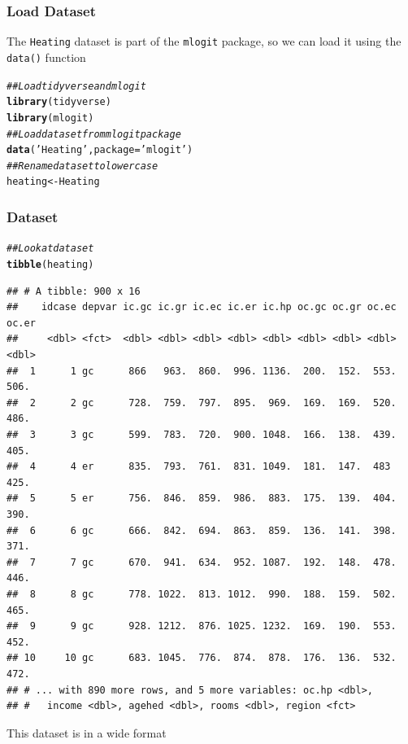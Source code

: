 \documentclass{beamer}\usepackage[]{graphicx}\usepackage[]{color}
\makeatletter
\newcommand{\hlstr}[1]{\textcolor[rgb]{0.192,0.494,0.8}{#1}}%
\newcommand{\hlcom}[1]{\textcolor[rgb]{0.678,0.584,0.686}{\textit{#1}}}%
\newcommand{\hlstd}[1]{\textcolor[rgb]{0.345,0.345,0.345}{#1}}%
\newcommand{\hlkwb}[1]{\textcolor[rgb]{0.69,0.353,0.396}{#1}}%
\newcommand{\hlkwc}[1]{\textcolor[rgb]{0.333,0.667,0.333}{#1}}%
\newcommand{\hlkwd}[1]{\textcolor[rgb]{0.737,0.353,0.396}{\textbf{#1}}}%
\newenvironment{kframe}{%
 \def\at@end@of@kframe{}%
 \ifinner\ifhmode%
  \def\at@end@of@kframe{\end{minipage}}%
  \begin{minipage}{\columnwidth}%
 \fi\fi%
 \def\FrameCommand##1{\hskip\@totalleftmargin \hskip-\fboxsep
 \colorbox{shadecolor}{##1}\hskip-\fboxsep
     \hskip-\linewidth \hskip-\@totalleftmargin \hskip\columnwidth}%
 \MakeFramed {\advance\hsize-\width
   \@totalleftmargin\z@ \linewidth\hsize
   \@setminipage}}%
 {\par\unskip\endMakeFramed%
 \at@end@of@kframe}
\newenvironment{knitrout}{}{} %
\makeatother
\begin{document}
\begin{frame}[fragile]\frametitle{Load Dataset}
    The \texttt{Heating} dataset is part of the \texttt{mlogit} package, so we can load it using the \texttt{data()} function \\
\begin{knitrout}\footnotesize
{}\color{fgcolor}\begin{kframe}
\begin{alltt}
\hlcom{## Load tidyverse and mlogit}
\hlkwd{library}\hlstd{(tidyverse)}
\hlkwd{library}\hlstd{(mlogit)}
\hlcom{## Load dataset from mlogit package}
\hlkwd{data}\hlstd{(}\hlstr{'Heating'}\hlstd{,} \hlkwc{package} \hlstd{=} \hlstr{'mlogit'}\hlstd{)}
\hlcom{## Rename dataset to lowercase}
\hlstd{heating} \hlkwb{<-} \hlstd{Heating}
\end{alltt}
\end{kframe}
\end{knitrout}
\end{frame}

\begin{frame}[fragile]\frametitle{Dataset}
\begin{knitrout}\footnotesize
{}\color{fgcolor}\begin{kframe}
\begin{alltt}
\hlcom{## Look at dataset}
\hlkwd{tibble}\hlstd{(heating)}
\end{alltt}
\begin{verbatim}
## # A tibble: 900 x 16
##    idcase depvar ic.gc ic.gr ic.ec ic.er ic.hp oc.gc oc.gr oc.ec oc.er
##     <dbl> <fct>  <dbl> <dbl> <dbl> <dbl> <dbl> <dbl> <dbl> <dbl> <dbl>
##  1      1 gc      866   963.  860.  996. 1136.  200.  152.  553.  506.
##  2      2 gc      728.  759.  797.  895.  969.  169.  169.  520.  486.
##  3      3 gc      599.  783.  720.  900. 1048.  166.  138.  439.  405.
##  4      4 er      835.  793.  761.  831. 1049.  181.  147.  483   425.
##  5      5 er      756.  846.  859.  986.  883.  175.  139.  404.  390.
##  6      6 gc      666.  842.  694.  863.  859.  136.  141.  398.  371.
##  7      7 gc      670.  941.  634.  952. 1087.  192.  148.  478.  446.
##  8      8 gc      778. 1022.  813. 1012.  990.  188.  159.  502.  465.
##  9      9 gc      928. 1212.  876. 1025. 1232.  169.  190.  553.  452.
## 10     10 gc      683. 1045.  776.  874.  878.  176.  136.  532.  472.
## # ... with 890 more rows, and 5 more variables: oc.hp <dbl>,
## #   income <dbl>, agehed <dbl>, rooms <dbl>, region <fct>
\end{verbatim}
\end{kframe}
\end{knitrout}
    \vspace{2ex}
    This dataset is in a wide format
\end{frame}
\end{document}
